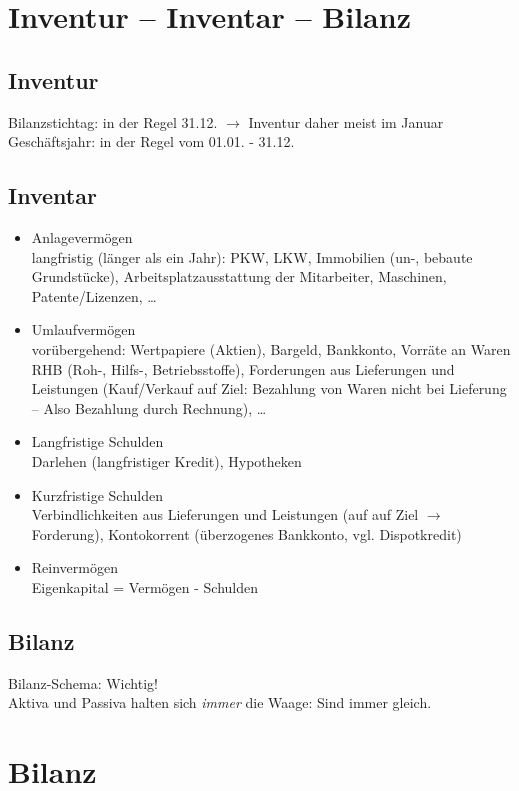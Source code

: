\section{Inventur -- Inventar -- Bilanz}
\subsection{Inventur}
Bilanzstichtag: in der Regel 31.12. $\to$ Inventur daher meist im Januar\\
Geschäftsjahr: in der Regel vom 01.01. - 31.12.
\subsection{Inventar}
\begin{itemize}
\item Anlagevermögen\\
langfristig (länger als ein Jahr): PKW, LKW, Immobilien (un-, bebaute Grundstücke), Arbeitsplatzausstattung der Mitarbeiter, Maschinen, Patente/Lizenzen, …
\item Umlaufvermögen\\
vorübergehend: Wertpapiere (Aktien), Bargeld, Bankkonto, Vorräte an Waren RHB (Roh-, Hilfs-, Betriebsstoffe), Forderungen aus Lieferungen und Leistungen (Kauf/Verkauf auf Ziel: Bezahlung von Waren nicht bei Lieferung -- Also Bezahlung durch Rechnung), …
\item Langfristige Schulden\\
Darlehen (langfristiger Kredit), Hypotheken
\item Kurzfristige Schulden\\
Verbindlichkeiten aus Lieferungen und Leistungen (auf auf Ziel $\to$ Forderung), Kontokorrent (überzogenes Bankkonto, vgl. Dispotkredit)
\item Reinvermögen\\
Eigenkapital = Vermögen - Schulden
\end{itemize}
\subsection{Bilanz}
Bilanz-Schema: Wichtig!\\
Aktiva und Passiva halten sich \emph{immer} die Waage: Sind immer gleich.

\section{Bilanz}
